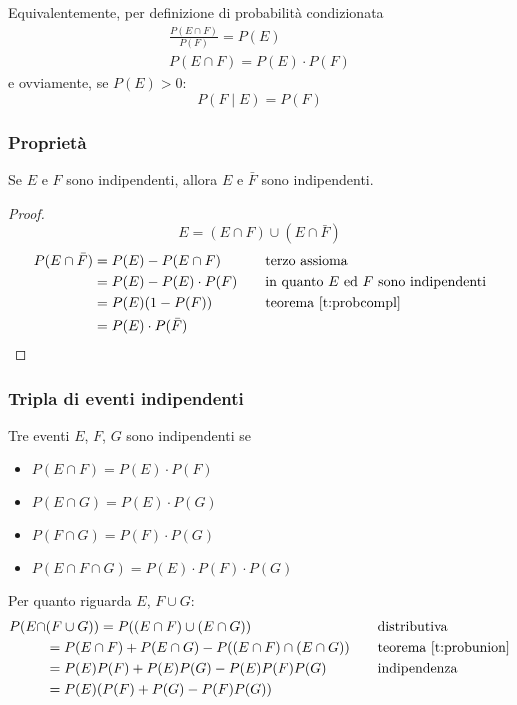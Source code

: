 Equivalentemente, per definizione di probabilità condizionata
\begin{gather*}
	\frac{P(E \cap F)}{P(F)}=P(E) \\[1ex]
	P(E \cap F)=P(E)\cdot P(F)
\end{gather*}
e ovviamente, se $P(E)>0$:
\begin{equation*}
	P(F \mid E)=P(F)
\end{equation*}

\subsubsection{Proprietà}
\begin{teor}
	Se $E$ e $F$ sono indipendenti, allora $E$ e $\bar F$ sono indipendenti.
\end{teor}
\begin{proof}
	\begin{equation*}
		E = (E\cap F) \cup (E \cap \bar F)
	\end{equation*}
	\begin{align*}
		P(E \cap \bar F) & = P(E) - P(E \cap F)    & \quad & \text{terzo assioma}                          \\
		                 & = P(E) - P(E)\cdot P(F) & \quad & \text{in quanto $E$ ed $F$ sono indipendenti} \\
		                 & = P(E)(1-P(F))          & \quad & \text{teorema \ref{t:probcompl}}              \\
		                 & = P(E)\cdot P(\bar F)
	\end{align*}
\end{proof}

\subsubsection{Tripla di eventi indipendenti}
\begin{defin}
	Tre eventi $E$, $F$, $G$ sono indipendenti se
	\begin{itemize}
		\item $P(E \cap F)=P(E)\cdot P(F)$
		\item $P(E \cap G)=P(E)\cdot P(G)$
		\item $P(F \cap G)=P(F)\cdot P(G)$
		\item $P(E \cap F \cap G)=P(E)\cdot P(F)\cdot P(G)$
	\end{itemize}
\end{defin}

\noindent
Per quanto riguarda $E$, $F\cup G$:
\begin{align*}
	P(E \cap & (F\cup G))  = P((E\cap F)\cup (E\cap G))                & \quad & \text{distributiva}              \\
	         & = P(E \cap F) + P(E\cap G) - P((E\cap F)\cap (E\cap G)) & \quad & \text{teorema \ref{t:probunion}} \\
	         & = P(E)P(F) + P(E)P(G) - P(E)P(F)P(G)                    & \quad & \text{indipendenza}              \\
	         & = P(E)(P(F) + P(G)-P(F)P(G))
\end{align*}

